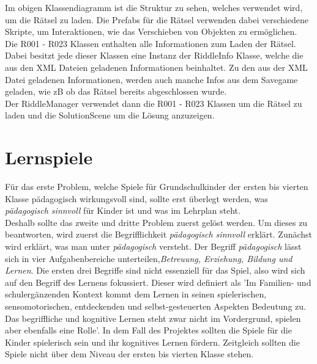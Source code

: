 
Im obigen Klassendiagramm ist die Struktur zu sehen, welches verwendet wird, um die Rätsel zu laden. Die Prefabs für die Rätsel verwenden dabei verschiedene Skripte, um Interaktionen, wie das Verschieben von Objekten zu ermöglichen.\\
Die R001 - R023 Klassen enthalten alle Informationen zum Laden der Rätsel. Dabei besitzt jede dieser Klassen eine Instanz der RiddleInfo Klasse, welche die aus den XML Dateien geladenen Informationen beinhaltet. Zu den aus der XML Datei geladenen Informationen, werden auch manche Infos aus dem Savegame geladen, wie zB ob das Rätsel bereits abgeschlossen wurde.\\
Der RiddleManager verwendet dann die R001 - R023 Klassen um die Rätsel zu laden und die SolutionScene um die Lösung anzuzeigen.

\section{Lernspiele}
Für das erste Problem, welche Spiele für Grundschulkinder der ersten bis vierten Klasse pädagogisch wirkungsvoll sind, sollte erst überlegt werden, was \textit{pädagogisch sinnvoll} für Kinder ist und was im Lehrplan steht.\\
Deshalb sollte das zweite und dritte Problem zuerst gelöst werden. Um dieses zu beantworten, wird zuerst die Begrifflichkeit \textit{pädagogisch sinnvoll} erklärt.  Zunächst wird erklärt, was man unter \textit{pädagogisch} versteht. Der Begriff \textit{pädagogisch} lässt sich in vier Aufgabenbereiche unterteilen,\textit{Betreuung, Erziehung, Bildung und Lernen}. Die ersten drei Begriffe sind nicht essenziell für das Spiel, also wird sich auf den Begriff des Lernens fokussiert. Dieser wird definiert als 'Im Familien- und schulergänzenden Kontext kommt dem Lernen in seinen spielerischen, sensomotorischen, entdeckenden und selbst-gesteuerten Aspekten Bedeutung zu. Das begriffliche und kognitive Lernen steht zwar nicht im Vordergrund, spielen aber ebenfalls eine Rolle'\autocite{PaedaLog}.
In dem Fall des Projektes sollten die Spiele für die Kinder spielerisch sein und ihr kognitives Lernen fördern. Zeitgleich sollten die Spiele nicht über dem Niveau der ersten bis vierten Klasse stehen.\\


